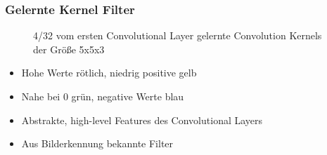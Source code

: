 \documentclass{beamer}
\begin{document}
\begin{frame}
	\frametitle{Gelernte Kernel Filter}
	\begin{figure}
	\caption{4/32 vom ersten Convolutional Layer gelernte Convolution Kernels der Größe 5x5x3}
	\label{fig:kernel}
	\end{figure}
	\begin{itemize}
		\item Hohe Werte rötlich, niedrig positive gelb
		\item Nahe bei 0 grün, negative Werte blau 
		\item Abstrakte, high-level Features des Convolutional Layers
		\item Aus Bilderkennung bekannte Filter
	\end{itemize}
\end{frame}
\end{document}
